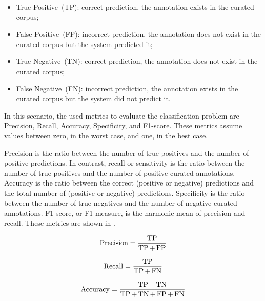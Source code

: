 \begin{itemize}

\item
True Positive~(TP): correct prediction, the annotation exists in the curated corpus;

\item
False Positive~(FP): incorrect prediction, the annotation does not exist in the curated corpus but the system predicted it;

\item
True Negative~(TN): correct prediction, the annotation does not exist in the curated corpus;

\item
False Negative~(FN): incorrect prediction, the annotation exists in the curated corpus but the system did not predict it.

\end{itemize}



In this scenario, the used metrics to evaluate the classification problem are Precision, Recall, Accuracy, Specificity, and F1-score.
These metrics assume values between zero, in the worst case, and one, in the best case.

Precision is the ratio between the number of true positives and the number of positive predictions.
In contrast, recall or sensitivity is the ratio between the number of true positives and the number of positive curated annotations.
Accuracy is the ratio between the correct (positive or negative) predictions and the total number of (positive or negative) predictions.
Specificity is the ratio between the number of true negatives and the number of negative curated annotations.
F1-score, or F1-measure, is the harmonic mean of precision and recall.
These metrics are shown in .

\begin{equation}
\label{eq:precision}
\mathop{\mathrm{Precision}}\nolimits = \frac{\mathop{\mathrm{TP}}\nolimits}{\mathop{\mathrm{TP}}\nolimits + \mathop{\mathrm{FP}}\nolimits}
\end{equation}

\begin{equation}
\label{eq:recall}
\mathop{\mathrm{Recall}}\nolimits = \frac{\mathop{\mathrm{TP}}\nolimits}{\mathop{\mathrm{TP}}\nolimits + \mathop{\mathrm{FN}}\nolimits}
\end{equation}

\begin{equation}
\label{eq:accuracy}
\mathop{\mathrm{Accuracy}}\nolimits = \frac{\mathop{\mathrm{TP}}\nolimits + \mathop{\mathrm{TN}}\nolimits}{\mathop{\mathrm{TP}}\nolimits + \mathop{\mathrm{TN}}\nolimits + \mathop{\mathrm{FP}}\nolimits + \mathop{\mathrm{FN}}\nolimits}
\end{equation}

